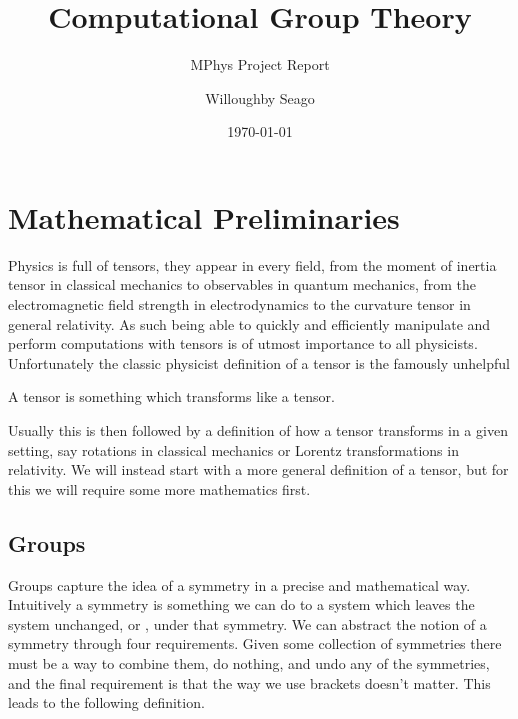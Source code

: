 \documentclass[fleqn]{NotesClass}
\title{Computational Group Theory}
\author{Willoughby Seago}
\date{\today}
\subtitle{MPhys Project Report}
\begin{document}
    \frontmatter
    \titlepage
    \maketitle
    \tableofcontents
    \mainmatter
    
    \chapter{Mathematical Preliminaries}
    Physics is full of tensors, they appear in every field, from the moment of inertia tensor in classical mechanics to observables in quantum mechanics, from the electromagnetic field strength in electrodynamics to the curvature tensor in general relativity.
    As such being able to quickly and efficiently manipulate and perform computations with tensors is of utmost importance to all physicists.
    Unfortunately the classic physicist definition of a tensor is the famously unhelpful
    \begin{displayquote}
        A tensor is something which transforms like a tensor.
    \end{displayquote}
    Usually this is then followed by a definition of how a tensor transforms in a given setting, say rotations in classical mechanics or Lorentz transformations in relativity.
    We will instead start with a more general definition of a tensor, but for this we will require some more mathematics first.
    
    
    \section{Groups}
    Groups capture the idea of a symmetry in a precise and mathematical way.
    Intuitively a symmetry is something we can do to a system which leaves the system unchanged, or , under that symmetry.
    We can abstract the notion of a symmetry through four requirements.
    Given some collection of symmetries there must be a way to combine them, do nothing, and undo any of the symmetries, and the final requirement is that the way we use brackets doesn't matter.
    This leads to the following definition.
    
\end{document}
